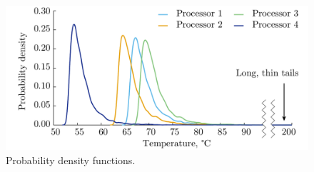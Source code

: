 \begin{figure}[br]
  \vspace{-1.0em}
  \centering
  \includegraphics[width=1.0\linewidth]{include/assets/motivation-pdf.pdf}
  \caption{Probability density functions.}
\end{figure}
